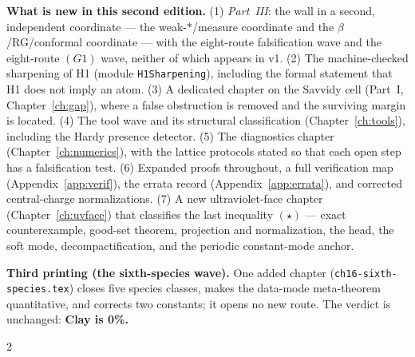 \documentclass[11pt,a4paper]{article}
\newcommand{\code}[1]{\texttt{\footnotesize #1}}
\begin{document}
\begin{v2box}
\textbf{What is new in this second edition.} (1) \emph{Part~III}: the wall in a second,
independent coordinate --- the weak-$*$/measure coordinate and the $\beta$/RG/conformal
coordinate --- with the eight-route falsification wave and the eight-route $(G1)$ wave, neither
of which appears in v1. (2) The machine-checked sharpening of H1 (module
\code{H1Sharpening}), including the formal statement that H1 does not imply an atom. (3) A
dedicated chapter on the Savvidy cell (Part~I, Chapter~\ref{ch:gap}), where a false obstruction
is removed and the surviving margin is located. (4) The tool wave and its structural
classification (Chapter~\ref{ch:tools}), including the Hardy presence detector. (5) The
diagnostics chapter (Chapter~\ref{ch:numerics}), with the lattice protocols stated so that each
open step has a falsification test. (6) Expanded proofs throughout, a full verification map
(Appendix~\ref{app:verif}), the errata record (Appendix~\ref{app:errata}), and corrected
central-charge normalizations. (7) A new ultraviolet-face chapter (Chapter~\ref{ch:uvface}) that
classifies the last inequality $(\star)$ --- exact counterexample, good-set theorem, projection and
normalization, the head, the soft mode, decompactification, and the periodic constant-mode anchor.

\smallskip
\textbf{Third printing (the sixth-species wave).} One added chapter
(\code{ch16-sixth-species.tex}) closes five species classes, makes the data-mode meta-theorem
quantitative, and corrects two constants; it opens no new route.
The verdict is unchanged: \textbf{Clay is 0\%.}
\end{v2box}

\newpage
\begin{multicols}{2}
{\small\tableofcontents}
\end{multicols}
\newpage





























\end{document}
